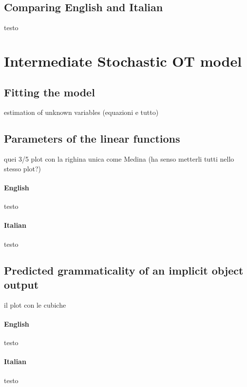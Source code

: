 \subsection{Comparing English and Italian} 

testo



\section{Intermediate Stochastic OT model} 


\subsection{Fitting the model} 

estimation of unknown variables (equazioni e tutto)


\subsection{Parameters of the linear functions} 

quei 3/5 plot con la righina unica come Medina (ha senso metterli tutti nello stesso plot?)

\paragraph{English} testo

\paragraph{Italian} testo


\subsection{Predicted grammaticality of an implicit object output} 

il plot con le cubiche

\paragraph{English} testo

\paragraph{Italian} testo



